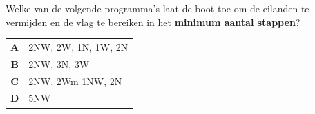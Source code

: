 \documentclass[12pt]{article}
\begin{document}
\begin{minipage}{\textwidth}
			Welke van de volgende programma's laat de boot toe om de eilanden te vermijden en de vlag te bereiken in het \textbf{minimum aantal stappen}?
	
			\begin{table}[H]
				\centering
				\begin{tabular}{|c l|}
					\hline
					\textbf{A} &  2NW, 2W, 1N, 1W, 2N \\ 
					\textbf{B} &  2NW, 3N, 3W \\
					\textbf{C} &  2NW, 2Wm 1NW, 2N \\ 
					\textbf{D} &  5NW \\ 
					\hline
				\end{tabular}
			\end{table}
	\end{minipage} \\ \\
	
\end{document}
